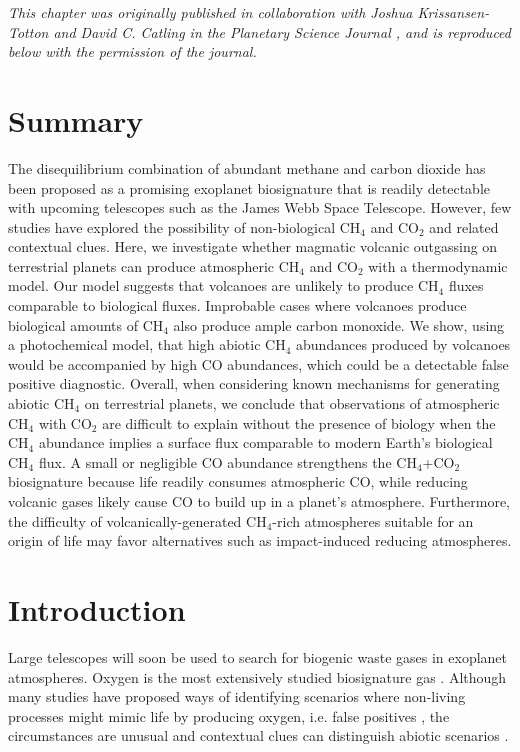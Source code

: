 
\noindent \textit{This chapter was originally published in collaboration with Joshua Krissansen-Totton and David C. Catling in the Planetary Science Journal \citep{Wogan_2020_methane}, and is reproduced below with the permission of the journal.}

\section*{\centering Summary}

The disequilibrium combination of abundant methane and carbon dioxide has been proposed as a promising exoplanet biosignature that is readily detectable with upcoming telescopes such as the James Webb Space Telescope. However, few studies have explored the possibility of non-biological CH$_4$ and CO$_2$ and related contextual clues. Here, we investigate whether magmatic volcanic outgassing on terrestrial planets can produce atmospheric CH$_4$ and CO$_2$ with a thermodynamic model. Our model suggests that volcanoes are unlikely to produce CH$_4$ fluxes comparable to biological fluxes. Improbable cases where volcanoes produce biological amounts of CH$_4$ also produce ample carbon monoxide. We show, using a photochemical model, that high abiotic CH$_4$ abundances produced by volcanoes would be accompanied by high CO abundances, which could be a detectable false positive diagnostic. Overall, when considering known mechanisms for generating abiotic CH$_4$ on terrestrial planets, we conclude that observations of atmospheric CH$_4$ with CO$_2$ are difficult to explain without the presence of biology when the CH$_4$ abundance implies a surface flux comparable to modern Earth's biological CH$_4$ flux. A small or negligible CO abundance strengthens the CH$_4$+CO$_2$ biosignature because life readily consumes atmospheric CO, while reducing volcanic gases likely cause CO to build up in a planet's atmosphere. Furthermore, the difficulty of volcanically-generated CH$_4$-rich atmospheres suitable for an origin of life may favor alternatives such as impact-induced reducing atmospheres.

\section{Introduction} \label{sec:intro}

Large telescopes will soon be used to search for biogenic waste gases in exoplanet atmospheres. Oxygen is the most extensively studied biosignature gas \citep{Meadows_2017,Meadows_2018}. Although many studies have proposed ways of identifying scenarios where non-living processes might mimic life by producing oxygen, i.e. false positives \citep{Domagal-Goldman_2014,Harman_2015,Luger_2015,Schwieterman_2019,Tian_2014,Wordsworth_2014}, the circumstances are unusual and contextual clues can distinguish abiotic scenarios \citep{Meadows_2018}.

